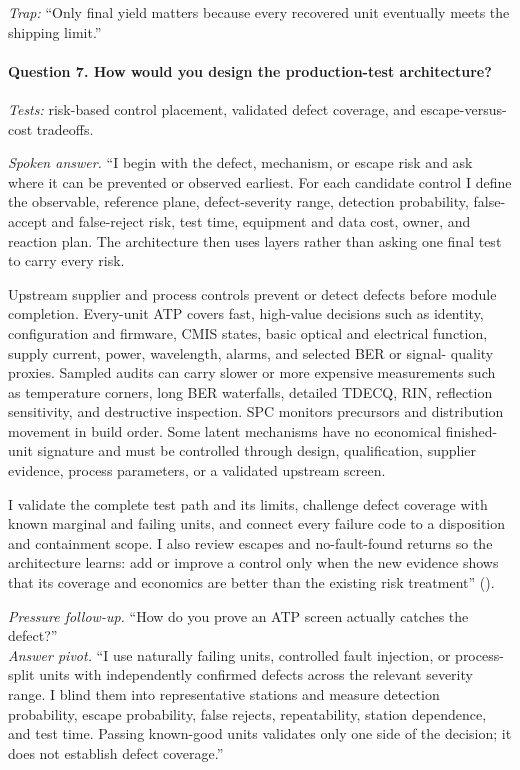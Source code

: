 \textit{Trap:} ``Only final yield matters because every recovered unit
eventually meets the shipping limit.''

\paragraph{Question 7. How would you design the production-test architecture?}
\textit{Tests:} risk-based control placement, validated defect coverage, and
escape-versus-cost tradeoffs.

\textit{Spoken answer.}
``I begin with the defect, mechanism, or escape risk and ask where it can be
prevented or observed earliest. For each candidate control I define the
observable, reference plane, defect-severity range, detection probability,
false-accept and false-reject risk, test time, equipment and data cost, owner,
and reaction plan. The architecture then uses layers rather than asking one
final test to carry every risk.

Upstream supplier and process controls prevent or detect defects before module
completion. Every-unit ATP covers fast, high-value decisions such as identity,
configuration and firmware, CMIS states, basic optical and electrical
function, supply current, power, wavelength, alarms, and selected BER or signal-
quality proxies. Sampled audits can carry slower or more expensive measurements
such as temperature corners, long BER waterfalls, detailed TDECQ, RIN,
reflection sensitivity, and destructive inspection. SPC monitors precursors
and distribution movement in build order. Some latent mechanisms have no
economical finished-unit signature and must be controlled through design,
qualification, supplier evidence, process parameters, or a validated upstream
screen.

I validate the complete test path and its limits, challenge defect coverage
with known marginal and failing units, and connect every failure code to a
disposition and containment scope. I also review escapes and no-fault-found
returns so the architecture learns: add or improve a control only when the new
evidence shows that its coverage and economics are better than the existing
risk treatment''
().

\textit{Pressure follow-up.} ``How do you prove an ATP screen actually catches
the defect?''\\
\textit{Answer pivot.} ``I use naturally failing units, controlled fault
injection, or process-split units with independently confirmed defects across
the relevant severity range. I blind them into representative stations and
measure detection probability, escape probability, false rejects,
repeatability, station dependence, and test time. Passing known-good units
validates only one side of the decision; it does not establish defect
coverage.''

